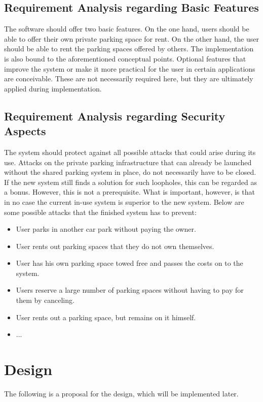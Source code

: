 \documentclass[
a4paper,     %
titlepage,   %
14pt         %
]{scrartcl}  %
\theoremstyle{mystyle}
\begin{document}
\subsection{Requirement Analysis regarding Basic Features}
The software should offer two basic features. On the one hand, users should be able to offer their own private parking space for rent. On the other hand, the user should be able to rent the parking spaces offered by others. The implementation is also bound to the aforementioned conceptual points. Optional features that improve the system or make it more practical for the user in certain applications are conceivable. These are not necessarily required here, but they are ultimately applied during implementation. 

\subsection{Requirement Analysis regarding Security Aspects}
The system should protect against all possible attacks that could arise during its use. Attacks on the private parking infrastructure that can already be launched without the shared parking system in place, do not necessarily have to be closed. If the new system still finds a solution for such loopholes, this can be regarded as a bonus. However, this is not a prerequisite. What is important, however, is that in no case the current in-use system is superior to the new system.
Below are some possible attacks that the finished system has to prevent:
\begin{itemize}
\item User parks in another car park without paying the owner.
\item User rents out parking spaces that they do not own themselves.
\item User has his own parking space towed free and passes the costs on to the system.
\item Users reserve a large number of parking spaces without having to pay for them by canceling.
\item User rents out a parking space, but remains on it himself.
\item ...
\end{itemize}

\section{Design}
The following is a proposal for the design, which will be implemented later.
\end{document}
